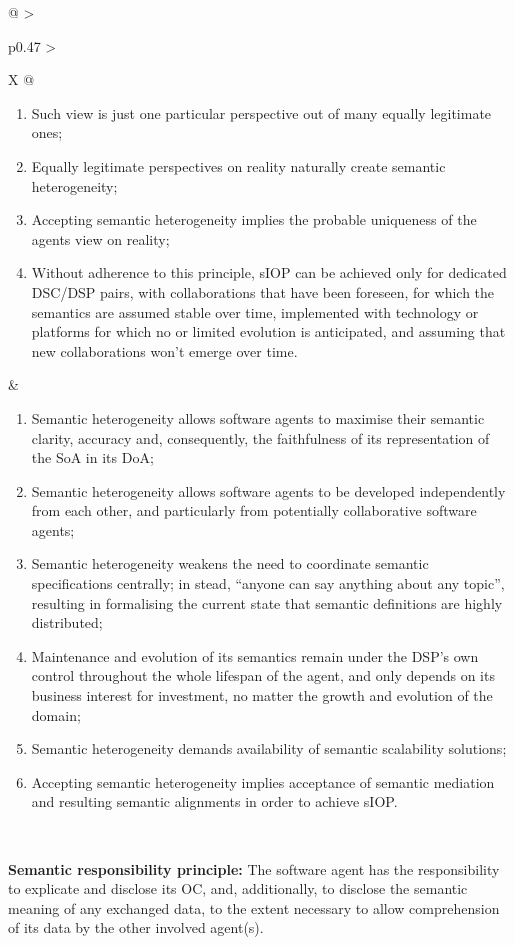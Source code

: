 \begin{xltabular}[l]{\linewidth}{@{} >{\small\raggedright\arraybackslash}p{0.47\linewidth} >{\small\raggedright\arraybackslash}X @{}}
\begin{enumerate}[left=6pt, nosep]
  \item Such view is just one particular perspective out of many equally legitimate ones;
  \item Equally legitimate perspectives on reality naturally create semantic heterogeneity;
  \item Accepting semantic heterogeneity implies the probable uniqueness of the agents view on reality;
  \item Without adherence to this principle, sIOP can be achieved only for dedicated DSC/DSP pairs, with collaborations that have been foreseen, for which the semantics are assumed stable over time, implemented with technology or platforms for which no or limited evolution is anticipated, and assuming that new collaborations won't emerge over time.
\end{enumerate}
&
\begin{enumerate}[left=10pt, nosep]
  \item Semantic heterogeneity allows software agents to maximise their semantic clarity, accuracy and, consequently, the faithfulness of its representation of the SoA in its DoA;
  \item Semantic heterogeneity allows software agents to be developed independently from each other, and particularly from potentially collaborative software agents;
  \item Semantic heterogeneity weakens the need to coordinate semantic specifications centrally; in stead, “anyone can say anything about any topic”, resulting in formalising the current state that semantic definitions are highly distributed;
  \item Maintenance and evolution of its semantics remain under the DSP’s own control throughout the whole lifespan of the agent, and only depends on its business interest for investment, no matter the growth and evolution of the domain;
  \item Semantic heterogeneity demands availability of semantic scalability solutions;
  \item Accepting semantic heterogeneity implies acceptance of semantic mediation and resulting semantic alignments in order to achieve sIOP.
\end{enumerate} \\
%
%
%
\begin{mmdp}\label{dp:srp}{\bfseries Semantic responsibility principle:}
\quad The software agent has the responsibility to explicate and disclose its OC, and, additionally, to disclose the semantic meaning of any exchanged data, to the extent necessary to allow comprehension of its data by the other involved agent(s). 

\end{mmdp}
\end{xltabular}
